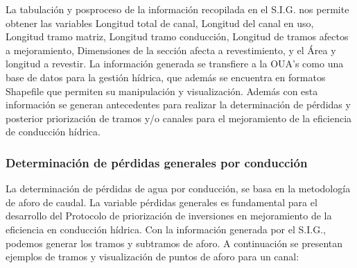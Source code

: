 \documentclass[]{article}
\begin{document}
La tabulación y posproceso de la información recopilada en el S.I.G. nos permite obtener las variables Longitud total de canal, Longitud del canal en uso, Longitud tramo matriz, Longitud tramo conducción, Longitud de tramos afectos a mejoramiento, Dimensiones de la sección afecta a revestimiento, y el Área y longitud a revestir. La información generada se transfiere a la OUA’s como una base de datos para la gestión hídrica, que además se encuentra en formatos Shapefile que permiten su manipulación y visualización. Además con esta información se generan antecedentes para realizar la determinación de pérdidas y posterior priorización de tramos y/o canales para el mejoramiento de la eficiencia de conducción hídrica.

\subsubsection{Determinación de pérdidas generales por conducción}

La determinación de pérdidas de agua por conducción, se basa en la metodología de aforo de caudal. La variable pérdidas generales es fundamental para el desarrollo del Protocolo de priorización de inversiones en mejoramiento de la eficiencia en conducción hídrica. Con la información generada por el S.I.G., podemos generar los tramos y subtramos de aforo. A continuación se presentan ejemplos de tramos y visualización de puntos de aforo para un canal:
\end{document}
